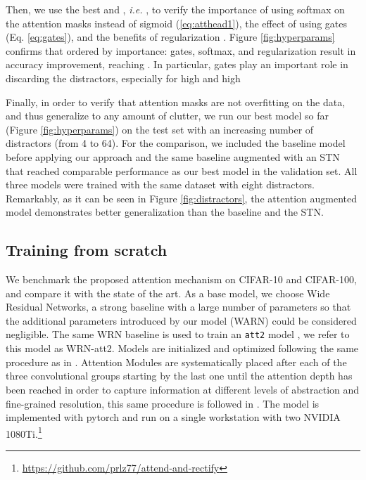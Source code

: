 \documentclass[runningheads]{llncs}
\begin{document}
Then, we use the best  and , \emph{i.e.} , to verify the importance of using softmax on the attention masks instead of sigmoid (\ref{eq:atthead1}), the effect of using gates (Eq. \ref{eq:gates}), and the benefits of regularization \cite{zhao2017diversified}. Figure \ref{fig:hyperparams} confirms that ordered by importance: gates, softmax, and regularization result in accuracy improvement, reaching . In particular, gates play an important role in discarding the distractors, especially for high  and high 

Finally, in order to verify that attention masks are not overfitting on the data, and thus generalize to any amount of clutter, we run our best model so far (Figure \ref{fig:hyperparams}) on the test set with an increasing number of distractors (from 4 to 64). For the comparison, we included the baseline model before applying our approach and the same baseline augmented with an STN \cite{jaderberg2015spatial} that reached comparable performance as our best model in the validation set. All three models were trained with the same dataset with eight distractors. Remarkably, as it can be seen in Figure \ref{fig:distractors}, the attention augmented model demonstrates better generalization than the baseline and the STN.

\subsection{Training from scratch}
We benchmark the proposed attention mechanism on CIFAR-10 and CIFAR-100, and compare it with the state of the art. As a base model, we choose Wide Residual Networks, a strong baseline with a large number of parameters so that the additional parameters introduced by our model (WARN) could be considered negligible. The same WRN baseline is used to train an \texttt{att2} model \cite{jetley2018learn}, we refer to this model as WRN-att2. Models are initialized and optimized following the same procedure as in \cite{Zagoruyko2016WRN}. Attention Modules are systematically placed after each of the three convolutional groups starting by the last one until the attention depth has been reached in order to capture information at different levels of abstraction and fine-grained resolution, this same procedure is followed in \cite{jetley2018learn}. The model is implemented with pytorch \cite{paszke2017pytorch} and run on a single workstation with two NVIDIA 1080Ti.\footnote{\url{https://github.com/prlz77/attend-and-rectify}}
\end{document}
